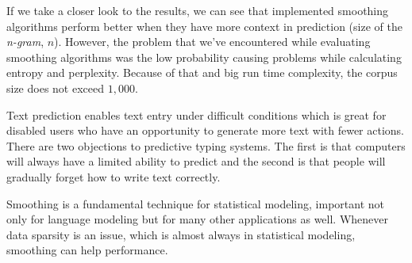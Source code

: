 \documentclass[10pt, a4paper]{article}
\begin{document}
If we take a closer look to the results, we can see that implemented smoothing algorithms perform better when they have more context in prediction (size of the \textit{n-gram}, $n$). However, the problem that we\rq{}ve encountered while evaluating smoothing algorithms was the low probability causing problems while calculating entropy and perplexity. Because of that and big run time complexity, the corpus size does not exceed $1,000$.

Text prediction enables text entry under difficult conditions which is great for disabled users who have an opportunity to generate more text with fewer actions. There are two objections to predictive typing systems. The first is that computers will always have a limited ability to predict and the second is that people will gradually forget how to write text correctly.

Smoothing is a fundamental technique for statistical modeling, important not only for language modeling but for many other applications as well. Whenever data sparsity is an issue, which is almost always in statistical modeling, smoothing can help performance.

{} 
\nocite{*}

\end{document}

